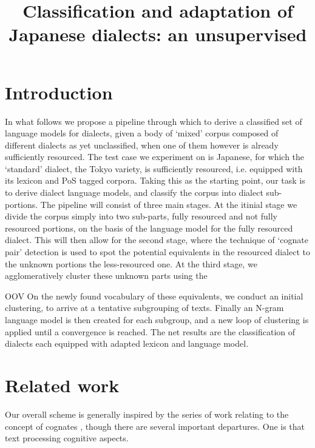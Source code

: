 \documentclass{article}
\title{Classification and adaptation of Japanese dialects: an unsupervised }
\begin{document}
\maketitle

\begin{abstract}
  
\end{abstract}

\section{Introduction}

In what follows we propose a pipeline through which to derive a classified set of language models for dialects, given a body of `mixed' corpus composed of different dialects as yet unclassified, when one of them however is already sufficiently resourced. The test case we experiment on is Japanese, for which the `standard' dialect, the Tokyo variety, is sufficiently resourced, i.e. equipped with its lexicon and PoS tagged corpora. Taking this as the starting point, our task is to derive dialect language models, and classify the corpus into dialect sub-portions. The pipeline will consist of three main stages. At the itinial stage we divide the corpus simply into two sub-parts, fully resourced and not fully resourced portions, on the basis of the language model for the fully resourced dialect. This will then allow for the second stage, where the technique of `cognate pair' detection is used to spot the potential equivalents in the resourced dialect to the unknown portions the less-resourced one. At the third stage, we agglomeratively cluster these unknown parts using the 

OOV On the newly found vocabulary of these equivalents, we conduct an initial clustering, to arrive at a tentative subgrouping of texts. Finally an N-gram language model is then created for each subgroup, and a new loop of clustering is applied until a convergence is reached. The net results are the classification of dialects each equipped with adapted lexicon and language model.

\section{Related work}

Our overall scheme is generally inspired by the series of work relating to the concept of cognates  \cite{Scherrer12}, though there are several important departures. One is that  text processing   cognitive aspects.
\end{document}
